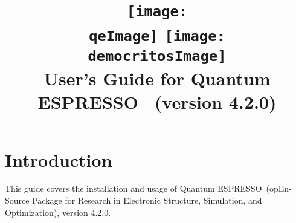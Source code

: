 \documentclass[12pt,a4paper]{article}
\def\version{4.2.0}
\def\qe{{\sc Quantum ESPRESSO}}
\begin{document}
 
\author{}
\date{}

\def\qeImage{quantum_espresso.pdf}
\def\democritosImage{democritos.pdf}

\begin{htmlonly}
\def\qeImage{quantum_espresso.png}
\def\democritosImage{democritos.png}
\end{htmlonly}

\title{
  \texttt{[image: \\qeImage]} \hskip 2cm
  \texttt{[image: \\democritosImage]}\\
  \vskip 1cm
  \Huge User's Guide for \qe\ \smallskip
  \Large (version \version)
}


\maketitle

\tableofcontents

\section{Introduction}

This guide covers the installation and usage of \qe\ (opEn-Source 
Package for Research in Electronic Structure, Simulation,
and Optimization), version \version.
\end{document}
